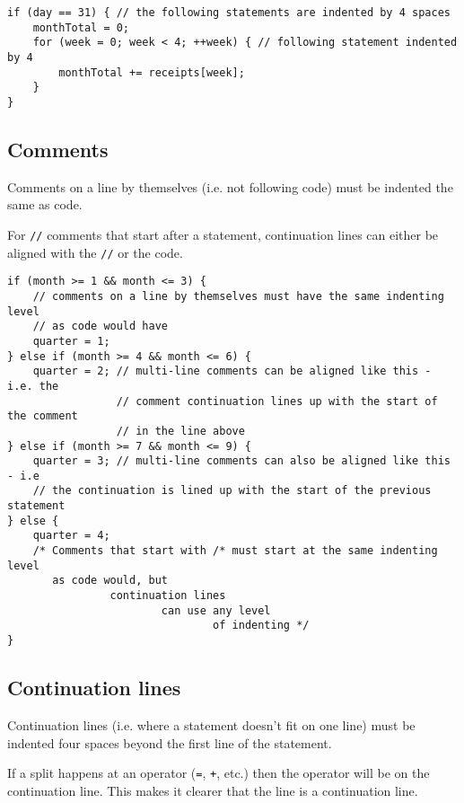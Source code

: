 \documentclass{article}
\begin{document}
\nolinenumbers
{}
\begin{lstlisting}[mathescape=true]
if (day == 31) { // the following statements are indented by 4 spaces
    monthTotal = 0;
    for (week = 0; week < 4; ++week) { // following statement indented by 4
        monthTotal += receipts[week];
    }
}
\end{lstlisting}
\linenumbers

\subsection{Comments}
Comments on a line by themselves (i.e. not following code) must be indented the same as code.

For \texttt{//} comments that start after a statement, continuation lines can either be aligned with the \texttt{//} or the code.

\nolinenumbers
{}
\begin{lstlisting}
if (month >= 1 && month <= 3) {
    // comments on a line by themselves must have the same indenting level
    // as code would have
    quarter = 1;
} else if (month >= 4 && month <= 6) {
    quarter = 2; // multi-line comments can be aligned like this - i.e. the
                 // comment continuation lines up with the start of the comment
                 // in the line above
} else if (month >= 7 && month <= 9) {
    quarter = 3; // multi-line comments can also be aligned like this - i.e
    // the continuation is lined up with the start of the previous statement
} else {
    quarter = 4;
    /* Comments that start with /* must start at the same indenting level
       as code would, but
                continuation lines
                        can use any level
                                of indenting */
}
\end{lstlisting}
\linenumbers

\subsection{Continuation lines}
Continuation lines (i.e. where a statement doesn't fit on one line) must be indented four spaces 
beyond the first line of the statement. 

If a split happens at an operator (\texttt{=}, \texttt{+}, etc.) then the operator will be on the continuation line. 
This makes it clearer that the line is a continuation line. 
\end{document}
